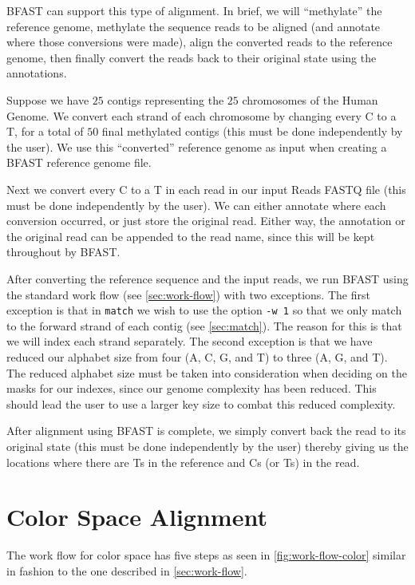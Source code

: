 \documentclass[a4paper,12pt]{book}
\newcommand{\TT}[1]{{\tt #1}} %
\newcommand{\RFF}{Reads FASTQ file}
\newcommand{\BRGF}{BFAST reference genome file} %
\begin{document}
BFAST can support this type of alignment.
In brief, we will ``methylate'' the reference genome, methylate the sequence reads to be aligned (and annotate where those conversions were made), align the converted reads to the reference genome, then finally convert the reads back to their original state using the annotations.

Suppose we have $25$ contigs representing the $25$ chromosomes of the Human Genome.
We convert each strand of each chromosome by changing every C to a T, for a total of $50$ final methylated contigs (this must be done independently by the user). 
We use this ``converted'' reference genome as input when creating a \BRGF{}.

Next we convert every C to a T in each read in our input \RFF{} (this must be done independently by the user). 
We can either annotate where each conversion occurred, or just store the original read.
Either way, the annotation or the original read can be appended to the read name, since this will be kept throughout by BFAST.

After converting the reference sequence and the input reads, we run BFAST using the standard work flow (see \autoref{sec:work-flow}) with two exceptions.
The first exception is that in \TT{match} we wish to use the option \TT{-w 1} so that we only match to the forward strand of each contig (see \autoref{sec:match}).
The reason for this is that we will index each strand separately.
The second exception is that we have reduced our alphabet size from four (A, C, G, and T) to three (A, G, and T).
The reduced alphabet size must be taken into consideration when deciding on the masks for our indexes, since our genome complexity has been reduced.
This should lead the user to use a larger key size to combat this reduced complexity.

After alignment using BFAST is complete, we simply convert back the read to its original state (this must be done independently by the user) thereby giving us the locations where there are Ts in the reference and Cs (or Ts) in the read.


\section{Color Space Alignment}
\label{sec:color-space-alignment}
The work flow for color space has five steps as seen in \autoref{fig:work-flow-color} similar in fashion to the one described in \autoref{sec:work-flow}.
\end{document}
